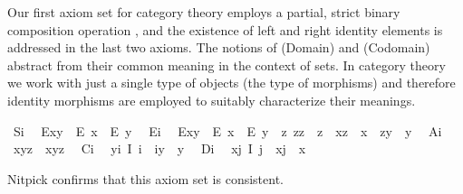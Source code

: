 \begin{isabellebody}
\begin{isamarkuptext}
Our first axiom set for category theory employs a partial, strict binary 
composition operation \isa{{\isasymcdot}}, and the existence of left and right identity elements is 
addressed in the last two axioms. The notions of  (Domain) and  (Codomain)
abstract from their common meaning in the context of sets. In category theory we
work with just a single type of objects (the type  of morphisms) and therefore 
identity morphisms are employed to suitably characterize their meanings.%
\end{isamarkuptext}\isamarkuptrue%
\ S\isactrlsub i{\isacharcolon}\ %
\ {\isachardoublequoteopen}E{\isacharparenleft}x{\isasymcdot}y{\isacharparenright}\ \isactrlbold {\isasymrightarrow}\ {\isacharparenleft}E\ x\ \isactrlbold {\isasymand}\ E\ y{\isacharparenright}{\isachardoublequoteclose}\ \isanewline
\ E\isactrlsub i{\isacharcolon}\ %
\ {\isachardoublequoteopen}E{\isacharparenleft}x{\isasymcdot}y{\isacharparenright}\ \isactrlbold {\isasymleftarrow}\ {\isacharparenleft}E\ x\ \isactrlbold {\isasymand}\ E\ y\ \isactrlbold {\isasymand}\ {\isacharparenleft}\isactrlbold {\isasymexists}z{\isachardot}\ z{\isasymcdot}z\ {\isasymcong}\ z\ \isactrlbold {\isasymand}\ x{\isasymcdot}z\ {\isasymcong}\ x\ \isactrlbold {\isasymand}\ z{\isasymcdot}y\ {\isasymcong}\ y{\isacharparenright}{\isacharparenright}{\isachardoublequoteclose}\ \isanewline
\ A\isactrlsub i{\isacharcolon}\ %
\ {\isachardoublequoteopen}x{\isasymcdot}{\isacharparenleft}y{\isasymcdot}z{\isacharparenright}\ {\isasymcong}\ {\isacharparenleft}x{\isasymcdot}y{\isacharparenright}{\isasymcdot}z{\isachardoublequoteclose}\ \isanewline
\ C\isactrlsub i{\isacharcolon}\ %
\ {\isachardoublequoteopen}\isactrlbold {\isasymforall}y{\isachardot}\isactrlbold {\isasymexists}i{\isachardot}\ I\ i\ \isactrlbold {\isasymand}\ i{\isasymcdot}y\ {\isasymcong}\ y{\isachardoublequoteclose}\ \isanewline
\ D\isactrlsub i{\isacharcolon}\ %
\ {\isachardoublequoteopen}\isactrlbold {\isasymforall}x{\isachardot}\isactrlbold {\isasymexists}j{\isachardot}\ I\ j\ \isactrlbold {\isasymand}\ x{\isasymcdot}j\ {\isasymcong}\ x{\isachardoublequoteclose}%
\begin{isamarkuptext}%
Nitpick confirms that this axiom set is consistent.%
\end{isamarkuptext}\isamarkuptrue%

\end{isabellebody}
